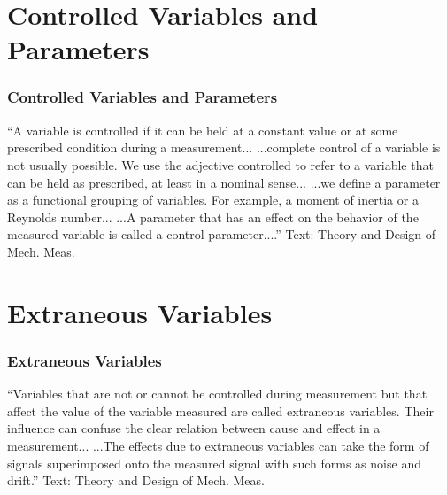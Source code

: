\documentclass[fleqn]{beamer} %
\newcommand{\sectiontitleIII}{Controlled Variables and Parameters}
\newcommand{\sectiontitleIV}{Extraneous Variables}
\begin{document}
\section{\sectiontitleIII}
\begin{frame}[label=sectionIII]
\frametitle{\sectiontitleIII}

{``A variable is {\BL controlled} if it can be held at a constant value
or at some prescribed condition during a measurement... ...complete control of a variable is not usually
possible. We use the adjective {\BL controlled} to refer to a variable that can be held as prescribed, at
least in a nominal sense... \vspc
...we define a {\GR parameter} as a functional grouping of variables. For example, a moment of inertia or a Reynolds number... ...A {\GR parameter} that has an effect on the behavior of the measured variable is called a control parameter....''} \vspc
{\tiny Text: Theory and Design of Mech. Meas.}

\end{frame}

\section{\sectiontitleIV}
\begin{frame}[label=sectionIV]
\frametitle{\sectiontitleIV}

{``Variables that are not or cannot be controlled during measurement but that affect the value of the
variable measured are called {\RD extraneous variables}. Their influence can confuse the clear relation
between cause and effect in a measurement... ...The effects due to {\RD extraneous variables} can take the form of signals superimposed
onto the measured signal with such forms as {\PR noise} and drift.''} \vspc
{\tiny Text: Theory and Design of Mech. Meas.}

\end{frame}

\end{document}
